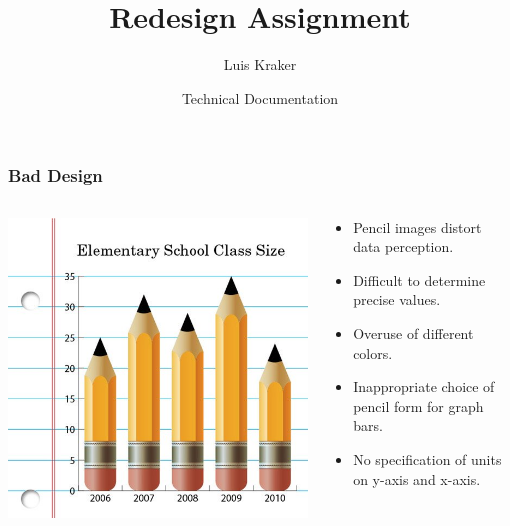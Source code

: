 \documentclass[aspectratio=43]{beamer}
\title{Redesign Assignment}
\author{Luis Kraker}
\institute{FH JOANNEUM}
\date{Technical Documentation}
\begin{document}
\begin{frame}
  \titlepage
\end{frame}

\begin{frame}
\frametitle{Bad Design}
\begin{columns}[T] %
\begin{column}{.48\textwidth}
   \includegraphics[width=\linewidth]{bad_graph.jpg}
\end{column}
\begin{column}{.48\textwidth}
    \begin{itemize}
        \item Pencil images distort data perception.
        \item Difficult to determine precise values.
        \item Overuse of different colors.
        \item Inappropriate choice of pencil form for graph bars.
        \item No specification of units on y-axis and x-axis.
    \end{itemize}
\end{column}
\end{columns}
\end{frame}
\end{document}
